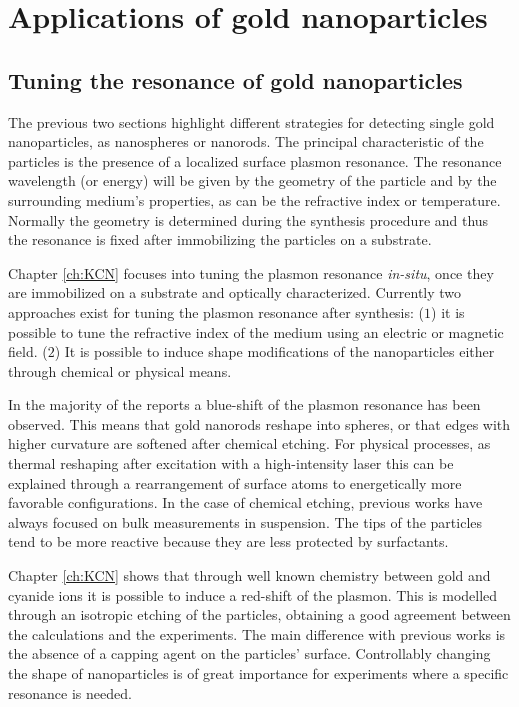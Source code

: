 \section{Applications of gold nanoparticles}
\subsection{Tuning the resonance of gold nanoparticles}
The previous two sections highlight different strategies for detecting single
gold nanoparticles, as nanospheres or nanorods. The principal characteristic
of the particles is the presence of a localized surface plasmon resonance.
The resonance wavelength (or energy) will be given by the geometry of the
particle and by the surrounding medium's properties, as can be the refractive
index or temperature. Normally the geometry is determined during the synthesis
procedure and thus the resonance is fixed after immobilizing the particles on a
substrate. 

Chapter \ref{ch:KCN} focuses into tuning the plasmon resonance \textit{in-situ},
once they are immobilized on a substrate and optically characterized. Currently
two approaches exist for tuning the plasmon resonance after synthesis: ($1$) it
is possible to tune the refractive index of the medium using an electric or
magnetic field\cite{Kossyrev2005}. ($2$) It is possible to induce shape
modifications of the nanoparticles either through
chemical\cite{Carbo-Argibay2007,Rodriguez-Fernandez2005,Jana2002,Tsung2006,Ni2008}
or physical means\cite{Link2000,Horiguchi2008,Yorulmaz2012}. 

In the majority of the reports a blue-shift of the plasmon resonance has been
observed. This means that gold nanorods reshape into spheres, or that edges with
higher curvature are softened after chemical etching. For physical processes, as
thermal reshaping after excitation with a high-intensity laser this can be
explained through a rearrangement of surface atoms to energetically more
favorable configurations. In the case of chemical etching, previous works have
always focused on bulk measurements in suspension. The tips of the particles
tend to be more reactive because they are less protected by surfactants. 

Chapter \ref{ch:KCN} shows that through well known chemistry between gold and
cyanide ions it is possible to induce a red-shift of the plasmon. This is
modelled through an isotropic etching of the particles, obtaining a good
agreement between the calculations and the experiments. The main difference with
previous works is the absence of a capping agent on the particles' surface.
Controllably changing the shape of nanoparticles is of great importance for
experiments where a specific resonance is needed. 


